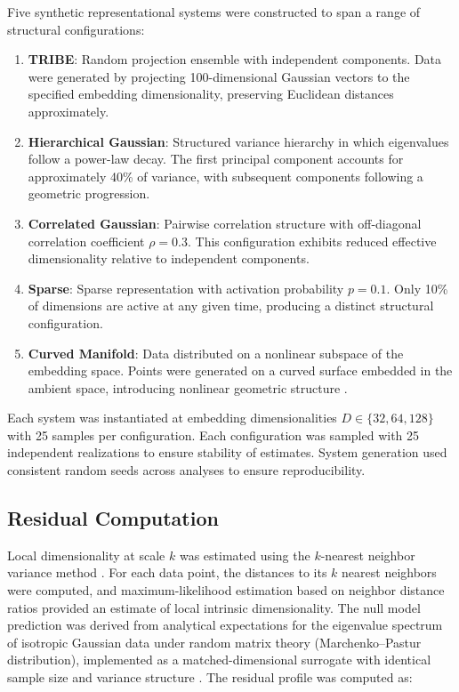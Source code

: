 \documentclass[11pt]{article}
\begin{document}
Five synthetic representational systems were constructed to span a range of structural configurations:

\begin{enumerate}
	\item \textbf{TRIBE}: Random projection ensemble with independent components. Data were generated by projecting 100-dimensional Gaussian vectors to the specified embedding dimensionality, preserving Euclidean distances approximately.

	\item \textbf{Hierarchical Gaussian}: Structured variance hierarchy in which eigenvalues follow a power-law decay. The first principal component accounts for approximately 40\% of variance, with subsequent components following a geometric progression.

	\item \textbf{Correlated Gaussian}: Pairwise correlation structure with off-diagonal correlation coefficient $\rho = 0.3$. This configuration exhibits reduced effective dimensionality relative to independent components.

	\item \textbf{Sparse}: Sparse representation with activation probability $p = 0.1$. Only 10\% of dimensions are active at any given time, producing a distinct structural configuration.

	\item \textbf{Curved Manifold}: Data distributed on a nonlinear subspace of the embedding space. Points were generated on a curved surface embedded in the ambient space, introducing nonlinear geometric structure \citep{tenenbaum2000global}.
\end{enumerate}

Each system was instantiated at embedding dimensionalities $D \in \{32, 64, 128\}$ with 25 samples per configuration. Each configuration was sampled with 25 independent realizations to ensure stability of estimates. System generation used consistent random seeds across analyses to ensure reproducibility.

\subsection{Residual Computation}

Local dimensionality at scale $k$ was estimated using the $k$-nearest neighbor variance method \citep{levina2005maximum}. For each data point, the distances to its $k$ nearest neighbors were computed, and maximum-likelihood estimation based on neighbor distance ratios provided an estimate of local intrinsic dimensionality. The null model prediction was derived from analytical expectations for the eigenvalue spectrum of isotropic Gaussian data under random matrix theory (Marchenko--Pastur distribution), implemented as a matched-dimensional surrogate with identical sample size and variance structure \citep{marchenko1967distribution}. The residual profile was computed as:
\end{document}
